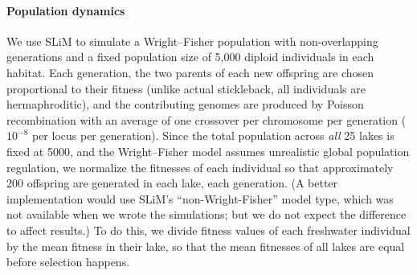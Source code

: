 \documentclass{article}
\begin{document}
\paragraph{Population dynamics}

We use SLiM to simulate a Wright--Fisher population with non-overlapping generations and a fixed population size of 5,000 diploid individuals in each habitat. 
Each generation, the two parents of each new offspring are chosen proportional to their fitness 
(unlike actual stickleback, all individuals are hermaphroditic), and the contributing genomes are produced by Poisson recombination with an average of one crossover per chromosome per generation ($10^{-8}$ per locus per generation). 
Since the total population across \emph{all} 25 lakes is fixed at 5000, and the Wright--Fisher model assumes unrealistic global population regulation, we normalize the fitnesses of each individual so that approximately 200 offspring are generated in each lake, each generation. 
(A better implementation would use SLiM's ``non-Wright-Fisher'' model type,
which was not available when we wrote the simulations; but we do not expect the difference to affect results.)
To do this, we divide fitness values of each freshwater individual by the mean fitness in their lake, so that the mean fitnesses of all lakes are equal before selection happens.
\end{document}
